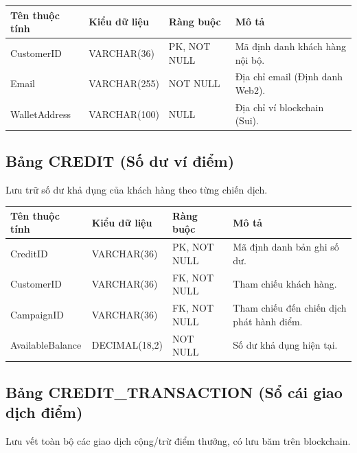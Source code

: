 \begin{table}[htbp]
    \centering
    \renewcommand{\arraystretch}{1.3}
    \begin{tabular}{|p{3cm}|p{3.2cm}|>{\raggedright\arraybackslash}p{3.2cm}|>{\raggedright\arraybackslash}p{4.8cm}|}
        \hline
        \textbf{Tên thuộc tính} & \textbf{Kiểu dữ liệu} & \textbf{Ràng buộc} & \textbf{Mô tả} \\ \hline
        CustomerID & VARCHAR(36) & PK, NOT NULL & Mã định danh khách hàng nội bộ. \\ \hline
        Email & VARCHAR(255) & NOT NULL & Địa chỉ email (Định danh Web2). \\ \hline
        WalletAddress & VARCHAR(100) & NULL & Địa chỉ ví blockchain (Sui). \\ \hline
    \end{tabular}
\end{table}

\subsection{Bảng CREDIT (Số dư ví điểm)}
Lưu trữ số dư khả dụng của khách hàng theo từng chiến dịch.

\begin{table}[htbp]
    \centering
    \renewcommand{\arraystretch}{1.3}
    \begin{tabular}{|p{3cm}|p{3.2cm}|>{\raggedright\arraybackslash}p{3.2cm}|>{\raggedright\arraybackslash}p{4.8cm}|}
        \hline
        \textbf{Tên thuộc tính} & \textbf{Kiểu dữ liệu} & \textbf{Ràng buộc} & \textbf{Mô tả} \\ \hline
        CreditID & VARCHAR(36) & PK, NOT NULL & Mã định danh bản ghi số dư. \\ \hline
        CustomerID & VARCHAR(36) & FK, NOT NULL & Tham chiếu khách hàng. \\ \hline
        CampaignID & VARCHAR(36) & FK, NOT NULL & Tham chiếu đến chiến dịch phát hành điểm. \\ \hline
        AvailableBalance & DECIMAL(18,2) & NOT NULL & Số dư khả dụng hiện tại. \\ \hline
    \end{tabular}
\end{table}

\subsection{Bảng CREDIT\_TRANSACTION (Sổ cái giao dịch điểm)}
Lưu vết toàn bộ các giao dịch cộng/trừ điểm thưởng, có lưu băm trên blockchain.

